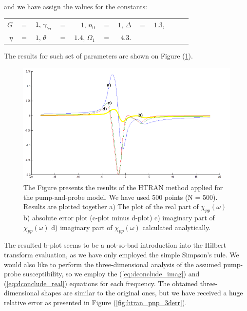 \documentclass[12pt,twoside,a4paper]{article}
\numberwithin{equation}{subsection}
\numberwithin{figure}{subsection}
\begin{document}
and we have assign the values for the constants:
\begin{tabular}{r r l r r l r r l r r l}
  $G$           & $=$ & $1$, 
  $\gamma_{ba}$ & $=$ & $1$, 
  $n_0$         & $=$ & $1$, 
  $\Delta$      & $=$ & $1.3$, \\
  $\eta$        & $=$ & $1$, 
  $\theta$      & $=$ & $1.4$, 
  $\Omega_{1}$  & $=$ & $4.3$. \\
\end{tabular}

The results for such set of parameters are shown on Figure (\ref{fig:htran_pnp_2d}).

\begin{figure}
  \includegraphics[width=150mm]{img/htran_pnp_2d.png}
  \caption{The Figure presents the results of the HTRAN method applied for the pump-and-probe model. We have used 500 points (N =
  500). Results are plotted together 
    a) The plot of the real part of $\chi_{pp} (\omega )$ 
    b) absolute error plot (c-plot minus d-plot) 
    c) imaginary part of $\chi_{pp} (\omega )$
    d) imaginary part of ${\chi_{pp}}(\omega )$ calculated analytically.
    \label{fig:htran_pnp_2d}}
\end{figure}

The resulted b-plot seems to be a not-so-bad introduction into the Hilbert transform evaluation, as we have only employed the simple Simpson's rule. We would also like to perform the three-dimensional analysis of the assumed pump-probe susceptibility, so we employ the (\ref{eq:dconclude_imag}) and (\ref{eq:dconclude_real}) equations for each frequency. The obtained three-dimensional shapes are similar to the original ones, but we have received a huge relative error as presented in Figure (\ref{fig:htran_pnp_3derr}).
\end{document}
